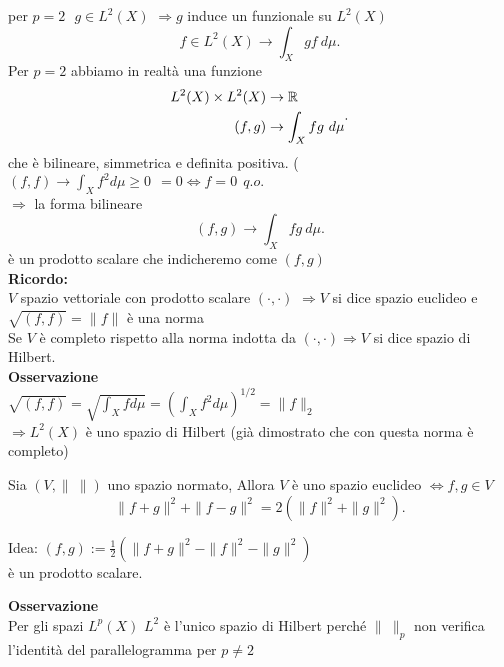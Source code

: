 \documentclass[12px]{article}
\begin{document}
per $p = 2 \ \ \ g\in L^2(X)$  $ \Rightarrow g$  induce un funzionale su $L^2(X)$ 
\[
f\in L^2(X) \rightarrow \int_Xgf \ d\mu
.\] 
Per $p = 2$ abbiamo in realtà una funzione \\
 \[
	 \begin{aligned}
		 L^2(X)\times L^2(X) &\rightarrow \mathbb{R}\\
		 (f,g) &\rightarrow \int_X fg \ d\mu
	 \end{aligned}
.\]  
che è bilineare, simmetrica  e definita positiva. ($(f,f) \rightarrow \int_X f^2 d\mu \geq 0 \ \ = 0  \Leftrightarrow f = 0 \ \ q.o.$ \\
$ \Rightarrow  $ la forma bilineare
\[
	(f,g) \rightarrow \int_Xfg\ d \mu
.\] 
è un prodotto scalare che indicheremo come $(f,g)$\\
\textbf{Ricordo:}\\
$V$ spazio vettoriale con prodotto scalare $(\cdot, \cdot )$  $ \Rightarrow  V$ si dice spazio euclideo e $\sqrt{(f,f)} = \|f\|$ è una norma\\
 Se $V$ è completo rispetto alla norma indotta da  $(\cdot,\cdot) \Rightarrow  V$ si dice spazio di Hilbert.\\
 \textbf{Osservazione}\\
 $\sqrt {(f,f)} = \sqrt{\int_X fd\mu}= (\int_Xf^2 d \mu)^{1/2} = \|f\|_2$\\
  $ \Rightarrow  L^2(X)$ è uno spazio di Hilbert (già dimostrato che con questa norma è completo)
  \begin{teo}
  	Sia $(V,\|\ \|)$ uno spazio normato, Allora $V$ è uno spazio euclideo $ \Leftrightarrow f,g\in V$
	\[
	\|f + g\|^2 + \|f-g\|^2 = 2(\|f\|^2 + \|g\|^2)
	.\] 
  \end{teo}
  \begin{dimo}
  	Idea: $(f,g) := \frac 12 (\|f+g\|^2 - \|f\|^2 - \|g\|^2)$\\
	è un prodotto scalare.
  \end{dimo}
  \textbf{Osservazione}\\
  Per gli spazi $L^p(X)$  $L^2$ è l'unico spazio di Hilbert perché  $\| \ \|_p$ non verifica l'identità del parallelogramma  per $p\neq 2$\\
\end{document}
